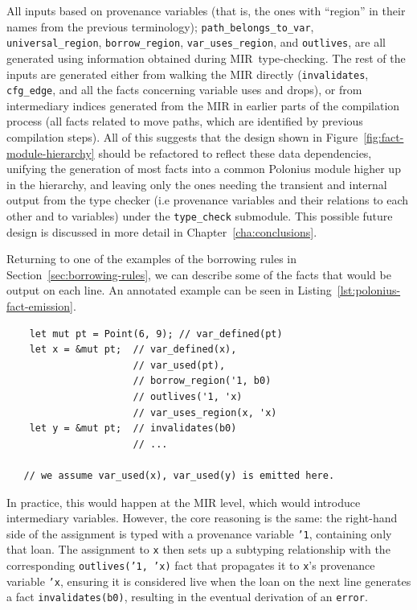 \documentclass[11pt,a4paper,twoside,openany,draft]{report}
\newenvironment{sourcecode}{\captionsetup{type=listing}}{}
\newcommand{\InRust}[1]{\texttt{#1}}
\newcommand{\InDatalog}[1]{\texttt{#1}}
\begin{document}
All inputs based on provenance variables (that is, the ones with ``region'' in
their names from the previous terminology); \texttt{path\_belongs\_to\_var},
\texttt{universal\_region}, \texttt{borrow\_region}, \texttt{var\_uses\_region},
and \texttt{outlives}, are all generated using information obtained during
MIR~type-checking. The rest of the inputs are generated either from walking the
MIR directly (\texttt{invalidates}, \texttt{cfg\_edge}, and all the facts
concerning variable uses and drops), or from intermediary indices generated from
the MIR in earlier parts of the compilation process (all facts related to move
paths, which are identified by previous compilation steps). All of this suggests
that the design shown in Figure~\ref{fig:fact-module-hierarchy} should be
refactored to reflect these data dependencies, unifying the generation of most
facts into a common Polonius module higher up in the hierarchy, and leaving only
the ones needing the transient and internal output from the type checker (i.e
provenance variables and their relations to each other and to variables) under
the \texttt{type\_check} submodule. This possible future design is discussed in
more detail in Chapter~\ref{cha:conclusions}.

Returning to one of the examples of the borrowing rules in
Section~\ref{sec:borrowing-rules}, we can describe some of the facts that would
be output on each line. An annotated example can be seen in
Listing~\ref{lst:polonius-fact-emission}.

\begin{sourcecode}
  \label{lst:polonius-fact-emission}
\begin{verbatim}
    let mut pt = Point(6, 9); // var_defined(pt)
    let x = &mut pt;  // var_defined(x),
                      // var_used(pt),
                      // borrow_region('1, b0)
                      // outlives('1, 'x)
                      // var_uses_region(x, 'x)
    let y = &mut pt;  // invalidates(b0)
                      // ...

   // we assume var_used(x), var_used(y) is emitted here.
\end{verbatim}
\end{sourcecode}

In practice, this would happen at the MIR level, which would introduce
intermediary variables. However, the core reasoning is the same: the right-hand
side of the assignment is typed with a provenance variable \InRust{'1},
containing only that loan. The assignment to \InRust{x} then sets up a subtyping
relationship with the corresponding \InDatalog{outlives('1, 'x)} fact that
propagates it to \InRust{x}'s provenance variable \InRust{'x}, ensuring it is
considered live when the loan on the next line generates a fact
\InRust{invalidates(b0)}, resulting in the eventual derivation of an
\InRust{error}.
\end{document}
